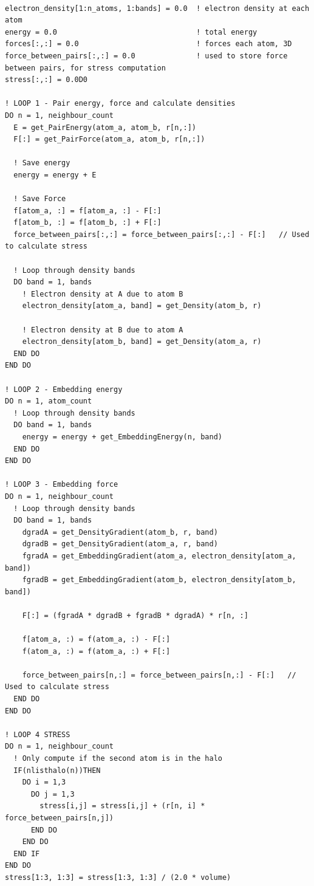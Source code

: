 \begin{lstlisting}[style=sFortran,caption={Pseudo Code for Energy and Stress Force Calculation}, label={listing:efscalc}]

electron_density[1:n_atoms, 1:bands] = 0.0  ! electron density at each atom
energy = 0.0                                ! total energy
forces[:,:] = 0.0                           ! forces each atom, 3D
force_between_pairs[:,:] = 0.0              ! used to store force between pairs, for stress computation
stress[:,:] = 0.0D0

! LOOP 1 - Pair energy, force and calculate densities
DO n = 1, neighbour_count
  E = get_PairEnergy(atom_a, atom_b, r[n,:])
  F[:] = get_PairForce(atom_a, atom_b, r[n,:])

  ! Save energy
  energy = energy + E

  ! Save Force
  f[atom_a, :] = f[atom_a, :] - F[:]
  f[atom_b, :] = f[atom_b, :] + F[:]
  force_between_pairs[:,:] = force_between_pairs[:,:] - F[:]   // Used to calculate stress
  
  ! Loop through density bands
  DO band = 1, bands
    ! Electron density at A due to atom B
    electron_density[atom_a, band] = get_Density(atom_b, r)
  
    ! Electron density at B due to atom A
    electron_density[atom_b, band] = get_Density(atom_a, r)
  END DO
END DO

! LOOP 2 - Embedding energy
DO n = 1, atom_count
  ! Loop through density bands
  DO band = 1, bands
    energy = energy + get_EmbeddingEnergy(n, band)
  END DO
END DO

! LOOP 3 - Embedding force
DO n = 1, neighbour_count
  ! Loop through density bands
  DO band = 1, bands
    dgradA = get_DensityGradient(atom_b, r, band)
    dgradB = get_DensityGradient(atom_a, r, band)
    fgradA = get_EmbeddingGradient(atom_a, electron_density[atom_a, band])
    fgradB = get_EmbeddingGradient(atom_b, electron_density[atom_b, band])

    F[:] = (fgradA * dgradB + fgradB * dgradA) * r[n, :]

    f[atom_a, :) = f(atom_a, :) - F[:] 
    f(atom_a, :) = f(atom_a, :) + F[:] 
    
    force_between_pairs[n,:] = force_between_pairs[n,:] - F[:]   // Used to calculate stress
  END DO
END DO

! LOOP 4 STRESS
DO n = 1, neighbour_count
  ! Only compute if the second atom is in the halo 
  IF(nlisthalo(n))THEN  
    DO i = 1,3
      DO j = 1,3
        stress[i,j] = stress[i,j] + (r[n, i] * force_between_pairs[n,j])
      END DO
    END DO
  END IF
END DO
stress[1:3, 1:3] = stress[1:3, 1:3] / (2.0 * volume)

\end{lstlisting}




